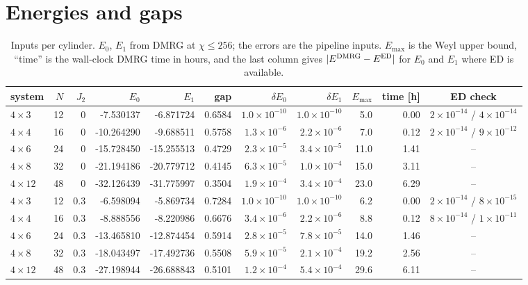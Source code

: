 \documentclass[10pt]{article}
\begin{document}
\section{Energies and gaps}

\begin{table}[h]
\centering\small
\caption{Inputs per cylinder. $E_0$, $E_1$ from DMRG at $\chi\le256$; the errors are the pipeline inputs.
$E_{\max}$ is the Weyl upper bound, ``time'' is the wall-clock DMRG time in hours, and the last column gives
$|E^{\rm DMRG}-E^{\rm ED}|$ for $E_0$ and $E_1$ where ED is available.}
\begin{tabular}{lrrrrrrrrrc}
\toprule
system & $N$ & $J_2$ & $E_0$ & $E_1$ & gap & $\delta E_0$ & $\delta E_1$ & $E_{\max}$ & time [h] & ED check \\
\midrule
$4\times3$ & 12 & 0 & -7.530137 & -6.871724 & 0.6584 & $1.0\times10^{-10}$ & $1.0\times10^{-10}$ & 5.0 & 0.00 & $2\times10^{-14}$ / $4\times10^{-14}$ \\
$4\times4$ & 16 & 0 & -10.264290 & -9.688511 & 0.5758 & $1.3\times10^{-6}$ & $2.2\times10^{-6}$ & 7.0 & 0.12 & $2\times10^{-14}$ / $9\times10^{-12}$ \\
$4\times6$ & 24 & 0 & -15.728450 & -15.255513 & 0.4729 & $2.3\times10^{-5}$ & $3.4\times10^{-5}$ & 11.0 & 1.41 & -- \\
$4\times8$ & 32 & 0 & -21.194186 & -20.779712 & 0.4145 & $6.3\times10^{-5}$ & $1.0\times10^{-4}$ & 15.0 & 3.11 & -- \\
$4\times12$ & 48 & 0 & -32.126439 & -31.775997 & 0.3504 & $1.9\times10^{-4}$ & $3.4\times10^{-4}$ & 23.0 & 6.29 & -- \\
$4\times3$ & 12 & 0.3 & -6.598094 & -5.869734 & 0.7284 & $1.0\times10^{-10}$ & $1.0\times10^{-10}$ & 6.2 & 0.00 & $2\times10^{-14}$ / $8\times10^{-15}$ \\
$4\times4$ & 16 & 0.3 & -8.888556 & -8.220986 & 0.6676 & $3.4\times10^{-6}$ & $2.2\times10^{-6}$ & 8.8 & 0.12 & $8\times10^{-14}$ / $1\times10^{-11}$ \\
$4\times6$ & 24 & 0.3 & -13.465810 & -12.874454 & 0.5914 & $2.8\times10^{-5}$ & $7.8\times10^{-5}$ & 14.0 & 1.46 & -- \\
$4\times8$ & 32 & 0.3 & -18.043497 & -17.492736 & 0.5508 & $5.9\times10^{-5}$ & $2.1\times10^{-4}$ & 19.2 & 2.56 & -- \\
$4\times12$ & 48 & 0.3 & -27.198944 & -26.688843 & 0.5101 & $1.2\times10^{-4}$ & $5.4\times10^{-4}$ & 29.6 & 6.11 & -- \\
\bottomrule
\end{tabular}
\end{table}
\end{document}
